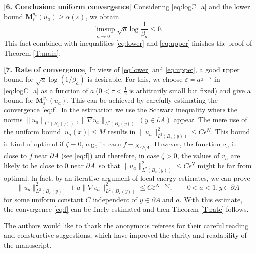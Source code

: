 \documentclass[graybox]{svmult}
\newcommand{\ep}{\varepsilon}
\renewcommand{\AA}{A}  %
\newcommand{\vmean}{\mathbf{M}}  %
\begin{document}
\vspace{3mm}
\noindent
\textbf{[6. Conclusion: uniform convergence]\hspace{2mm}}
Considering \eqref{eq:logC_a} and the lower bound $\vmean_{\ep}^{y_a}({u_a})\ge \alpha(\ep)$, we obtain 
\[
\limsup_{a\to0^+} \sqrt{a} \log \frac1{\beta_a} \le 0.
\] This fact combined with inequalities \eqref{eq:lower} and \eqref{eq:upper} finishes the proof of Theorem \ref{T:main}.  



\vspace{3mm}
\noindent
\textbf{[7. Rate of convergence]\hspace{2mm}}  In view of \eqref{eq:lower} and \eqref{eq:upper}, a good upper bound for $\sqrt{a}\log(1/\beta_a)$ is desirable.  For this, we choose $\ep = a^{\frac1{2}-\tau}$ in \eqref{eq:logC_a} as a function of $a$ ($0<\tau<\frac1{2}$ is arbitrarily small but fixed)  and give a bound for $\vmean_\ep^{y_a}(u_a)$. This can be achieved by carefully estimating the convergence \eqref{eq:f}. In the estimation we use the Schwarz inequality where the norms $\|u_a\|_{L^2(B_\ep(y))}, \|\nabla u_a\|_{L^2(B_\ep(y))} ~(y\in \partial \AA)$ appear. The mere use of the uniform bound $|u_a(x)|\le M$ results in $\|u_a\|_{L^2(B_\ep(y))}^2 \le C\epsilon^N $. This bound is kind of optimal if $\zeta=0$, e.g., in case $f=\chi_{\Omega\setminus \overline{\AA}}$. However,  the function $u_a$ is close to $f$ near $\partial \AA$ (see \eqref{eq:f}) and therefore, in case $\zeta>0$, the values of $u_a$ are likely to be close to $0$ near $\partial \AA$, so that $\|u_a\|_{L^2(B_\ep(y))}^2 \le C\epsilon^N $ might be far from optimal. In fact, by an iterative argument of local energy estimates, we can prove
\[
\|u_a\|_{L^2(B_\ep(y))}^2 + a \|\nabla u_a\|_{L^2(B_\ep(y))}^2 \le C \ep^{N + 2\zeta}, \qquad 0<a<1, y \in \partial \AA  
\]
for some uniform constant $C$ independent of $y \in \partial \AA$ and $a$. With this estimate, the convergence \eqref{eq:f} can be finely estimated and then Theorem \ref{T:rate} follows. 



\begin{acknowledgement}
The authors would like to thank the anonymous referees for their careful reading and constructive suggestions, which have improved the clarity and readability of the manuscript.
\end{acknowledgement}
%
\end{document}
